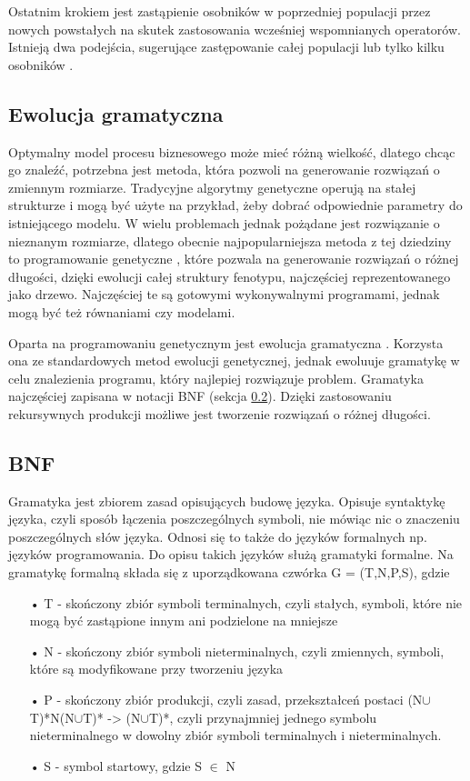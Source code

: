 Ostatnim krokiem jest zastąpienie osobników w poprzedniej populacji przez nowych powstałych na skutek zastosowania wcześniej wspomnianych operatorów. Istnieją dwa podejścia, sugerujące zastępowanie całej populacji lub tylko kilku osobników \cite{SSvsGen}.


\subsection{Ewolucja gramatyczna}
Optymalny model procesu biznesowego może mieć różną wielkość, dlatego chcąc go znaleźć, potrzebna jest metoda, która pozwoli na generowanie rozwiązań o zmiennym rozmiarze. Tradycyjne algorytmy genetyczne operują na stałej strukturze i mogą być użyte na przykład, żeby dobrać odpowiednie parametry do istniejącego modelu. W wielu problemach jednak pożądane jest rozwiązanie o nieznanym rozmiarze, dlatego obecnie najpopularniejsza metoda z tej dziedziny to programowanie genetyczne \cite{Koza:1990:pat-GAsp}\cite{10.5555/138936}, które pozwala na generowanie rozwiązań o różnej długości, dzięki ewolucji całej struktury fenotypu, najczęściej reprezentowanego jako drzewo. Najczęściej te są gotowymi wykonywalnymi programami, jednak mogą być też równaniami czy modelami.

Oparta na programowaniu genetycznym jest ewolucja gramatyczna \cite{ryan_collins_neill_1998}. Korzysta ona ze standardowych metod ewolucji genetycznej, jednak ewoluuje gramatykę w celu znalezienia programu, który najlepiej rozwiązuje problem. Gramatyka najczęściej zapisana w notacji BNF (sekcja \ref{sec:BNF}). Dzięki zastosowaniu rekursywnych produkcji możliwe jest tworzenie rozwiązań o różnej długości. 

\subsection{BNF}
\label{sec:BNF}
Gramatyka jest zbiorem zasad opisujących budowę języka. Opisuje syntaktykę języka, czyli sposób łączenia poszczególnych symboli, nie mówiąc nic o znaczeniu poszczególnych słów języka. Odnosi się to także do języków formalnych np. języków programowania. Do opisu takich języków służą gramatyki formalne. Na gramatykę formalną składa się z uporządkowana czwórka G = (T,N,P,S), gdzie 

\begin{itemize}
  \item[•] T - skończony zbiór symboli terminalnych, czyli stałych, symboli, które nie mogą być zastąpione innym ani podzielone na mniejsze 
  \item[•] N - skończony zbiór symboli nieterminalnych, czyli zmiennych, symboli, które są modyfikowane przy tworzeniu języka
  \item[•] P - skończony zbiór produkcji, czyli zasad, przekształceń postaci (N$\cup$T)*N(N$\cup$T)* -> (N$\cup$T)*, czyli przynajmniej jednego symbolu nieterminalnego w dowolny zbiór symboli terminalnych i nieterminalnych.
  \item[•] S - symbol startowy, gdzie S $\in$ N
\end{itemize}

